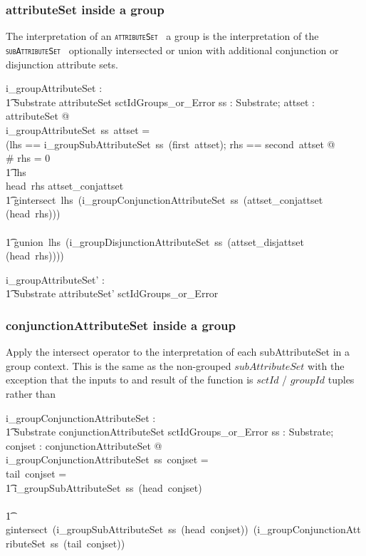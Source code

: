 \documentclass{article}
\def\spec#1{{\tt \small \textsc{{#1}} }}
\begin{document}
\subsubsection{attributeSet inside a group}
The interpretation of an \spec{attributeSet} a group is the interpretation of the \spec{subAttributeSet}
optionally intersected or union with additional conjunction or disjunction attribute sets.


\begin{axdef}
   i\_groupAttributeSet : \\
\t1 Substrate \fun attributeSet \fun sctIdGroups\_or\_Error
\where
   \forall ss : Substrate; attset : attributeSet @ \\
   i\_groupAttributeSet~ss~attset = \\
   (\LET lhs == i\_groupSubAttributeSet~ss~(first~attset); rhs == second~attset @ \\
 \IF \# rhs = 0 \THEN \\
 \t1 lhs \\
 \ELSE \IF head~rhs \in \ran attset\_conjattset \THEN \\
 \t1 gintersect~lhs~(i\_groupConjunctionAttributeSet~ss~(attset\_conjattset \inv (head~rhs))) \\
  \ELSE \\
  \t1 gunion~lhs~(i\_groupDisjunctionAttributeSet~ss~(attset\_disjattset \inv (head~rhs))))
\end{axdef}
\begin{axdef}
   i\_groupAttributeSet' : \\
\t1 Substrate \fun attributeSet' \fun sctIdGroups\_or\_Error
\end{axdef}

\subsubsection{conjunctionAttributeSet inside a group}
Apply the intersect operator to the interpretation of each  subAttributeSet in a group context. This is the same as the non-grouped $subAttributeSet$ with the exception that the inputs to and result of the function is $sctId$ / $groupId$ tuples rather than



\begin{axdef}
    i\_groupConjunctionAttributeSet : \\
\t1 Substrate \fun conjunctionAttributeSet \fun sctIdGroups\_or\_Error
\where
   \forall ss : Substrate;  conjset : conjunctionAttributeSet @ \\
   i\_groupConjunctionAttributeSet~ss~conjset = ~ \\
   \IF tail~conjset = \langle \rangle \THEN \\
   \t1 i\_groupSubAttributeSet~ss~(head~conjset) \\
\ELSE \\
\t1 gintersect~(i\_groupSubAttributeSet~ss~(head~conjset))~(i\_groupConjunctionAttributeSet~ss~(tail~conjset))
\end{axdef}
\end{document}
